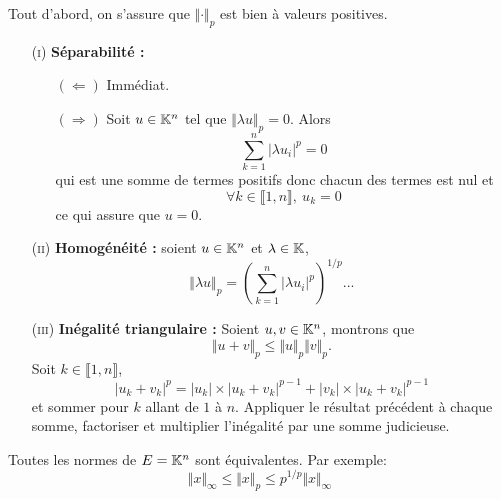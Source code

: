 \begin{preuve}
    Tout d'abord, on s'assure que $\Vert \bm{\cdot} \Vert_p$ est bien à valeurs positives.
    \begin{itemize}
        \item[(\textsc{i})] \textbf{Séparabilité :}
        \begin{itemize}
            \item[$(\Leftarrow)$] Immédiat.
            \item[$(\Rightarrow)$] Soit $u \in \mathbb{K}^n$ tel que $\Vert \lambda u \Vert_p = 0$. Alors
            $$\sum_{k=1}^{n} |\lambda u_i|^p = 0$$
            qui est une somme de termes positifs donc chacun des termes est nul et $$\forall k \in \llbracket 1, n \rrbracket,\ u_k = 0$$
            ce qui assure que $u = 0$.
        \end{itemize}
        \item[(\textsc{ii})] \textbf{Homogénéité :} soient $u \in \mathbb{K}^n$ et $\lambda \in \mathbb{K}$,
        $$\Vert \lambda u \Vert_p = \left (\sum_{k=1}^{n} |\lambda u_i|^p \right)^{1/p} ...$$
        \item[(\textsc{iii})] \textbf{Inégalité triangulaire :} 
        Soient $u, v \in \mathbb{K}^n$, montrons que 
        $$\Vert u + v \Vert_p \leqslant \Vert u \Vert_p \Vert v \Vert_p.$$
        Soit $k \in \llbracket 1, n \rrbracket$,
        $$|u_k + v_k|^p = |u_k| \times |u_k + v_k|^{p-1} + |v_k| \times |u_k + v_k|^{p-1}$$ 
        et sommer pour $k$ allant de $1$ à $n$. Appliquer le résultat précédent à chaque somme, factoriser et multiplier l'inégalité par une somme judicieuse. 
    \end{itemize}
\end{preuve}    

\begin{prop}{}
    Toutes les normes de $E = \mathbb{K}^n$ sont équivalentes. Par exemple:
    $$\Vert x \Vert_\infty \leqslant \Vert x \Vert_p \leqslant p^{1/p} \Vert x \Vert_\infty$$
\end{prop}
